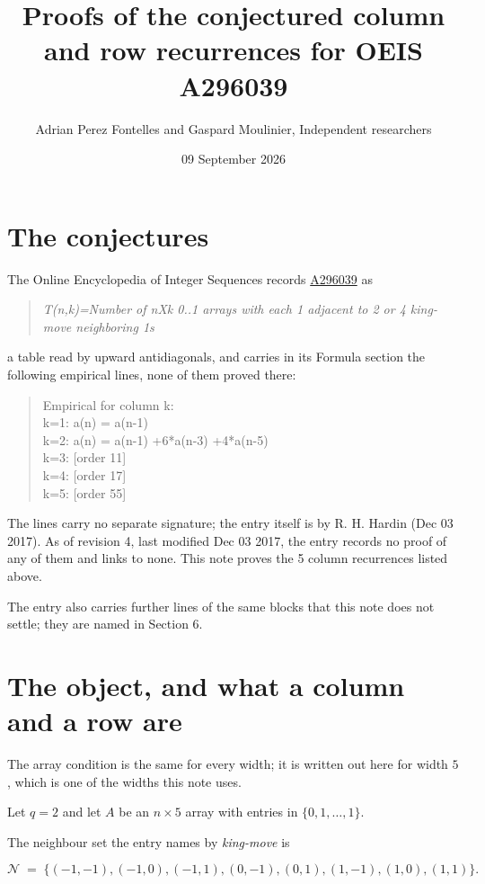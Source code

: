 \documentclass[11pt]{article}
\title{Proofs of the conjectured column and row recurrences for OEIS A296039}
\author{Adrian Perez Fontelles and Gaspard Moulinier, Independent researchers}
\date{09 September 2026}
\theoremstyle{definition}
\begin{document}
\maketitle
\section{The conjectures}

The Online Encyclopedia of Integer Sequences records \href{https://oeis.org/A296039}{A296039} as

\begin{quote}\itshape T(n,k)=Number of nXk 0..1 arrays with each 1 adjacent to 2 or 4 king-move neighboring 1s\end{quote}

a table read by upward antidiagonals, and carries in its Formula section the following empirical lines, none of them proved there:

\begin{quote}\ttfamily Empirical for column k:\\
k=1: a(n) = a(n-1)\\k=2: a(n) = a(n-1) +6*a(n-3) +4*a(n-5)\\k=3: [order 11]\\k=4: [order 17]\\k=5: [order 55]\end{quote}

The lines carry no separate signature; the entry itself is by R. H. Hardin (Dec 03 2017). As of revision 4, last modified Dec 03 2017, the entry records no proof of any of them and links to none. This note proves the 5 column recurrences listed above.

The entry also carries further lines of the same blocks that this note does not settle; they are named in Section 6.

\section{The object, and what a column and a row are}

The array condition is the same for every width; it is written out here for width $5$, which is one of the widths this note uses.

Let $q = 2$ and let $A$ be an $n \times 5$ array with entries in $\{0,1,\dots,1\}$.

The neighbour set the entry names by {\itshape king-move} is

\[\mathcal{N} \;=\; \{(-1,-1), (-1,0), (-1,1), (0,-1), (0,1), (1,-1), (1,0), (1,1)\}.\]
\end{document}
